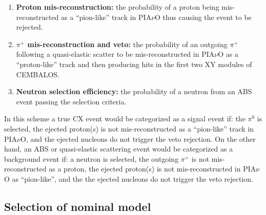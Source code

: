 {\begin{enumerate}
\item{{\bf Proton mis-reconstruction:} the probability of a proton being mis-reconstructed as a ``pion-like'' track in PIA$\nu$O thus causing the event to be rejected.}

\item{{\bf $\pi^{+}$ mis-reconstruction and veto:} the probability of an outgoing $\pi^{+}$ following a quasi-elastic scatter to be mis-reconstructed in PIA$\nu$O as a ``proton-like'' track and then producing hits in the first two XY modules of CEMBALOS.}

\item{{\bf Neutron selection efficiency:} the probability of a neutron from an ABS event passing the selection criteria.}
\end{enumerate}

In this scheme a true CX event would be categorized as a signal event if: the $\pi^{0}$ is selected, the ejected proton(s) is not mis-reconstructed as a ``pion-like'' track in PIA$\nu$O, and the ejected nucleons do not trigger the veto rejection. On the other hand, an ABS or quasi-elastic scattering event would be categorized as a background event if: a neutron is selected, the outgoing $\pi^{+}$ is not mis-reconstructed as a proton, the ejected proton(s) is not mis-reconstructed in PIA$\nu$O as ``pion-like'', and the the ejected nucleons do not trigger the veto rejection. 

\subsection{Selection of nominal model}\label{sec:nominal}

}
